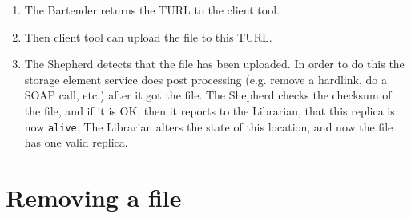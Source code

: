 \documentclass{book}
\begin{document}
\begin{enumerate}
    \item The Bartender returns the TURL to the client tool.
    \item Then client tool can upload the file to this TURL.
    \item The Shepherd detects that the file has been uploaded. In order to do this the storage element service does post processing (e.g. remove a hardlink, do a SOAP call, etc.) after it got the file. The Shepherd checks the checksum of the file, and if it is OK, then it reports to the Librarian, that this replica is now \verb#alive#. The Librarian alters the state of this location, and now the file has one valid replica. 
\end{enumerate}


\section{Removing a file} %
\label{sec:removing_a_file}
\end{document}
